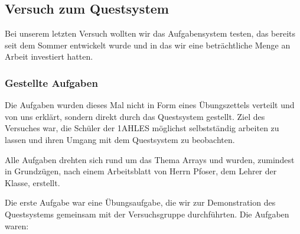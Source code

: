 

\subsection{Versuch zum Questsystem}
Bei unserem letzten Versuch wollten wir das Aufgabensystem testen, das bereits seit dem Sommer entwickelt wurde und in das wir eine beträchtliche Menge an Arbeit investiert hatten.

\subsubsection*{Gestellte Aufgaben}
Die Aufgaben wurden dieses Mal nicht in Form eines Übungszettels verteilt und von uns erklärt, sondern direkt durch das Questsystem gestellt. Ziel des Versuches war, die Schüler der 1AHLES möglichst selbstständig arbeiten zu lassen und ihren Umgang mit dem Questsystem zu beobachten.

Alle Aufgaben drehten sich rund um das Thema \glqq{}Arrays\grqq{} und wurden, zumindest in Grundzügen, nach einem Arbeitsblatt von Herrn Pfoser, dem Lehrer der Klasse, erstellt.

Die erste Aufgabe war eine Übungsaufgabe, die wir zur Demonstration des Questsystems gemeinsam mit der Versuchsgruppe durchführten. Die Aufgaben waren:

